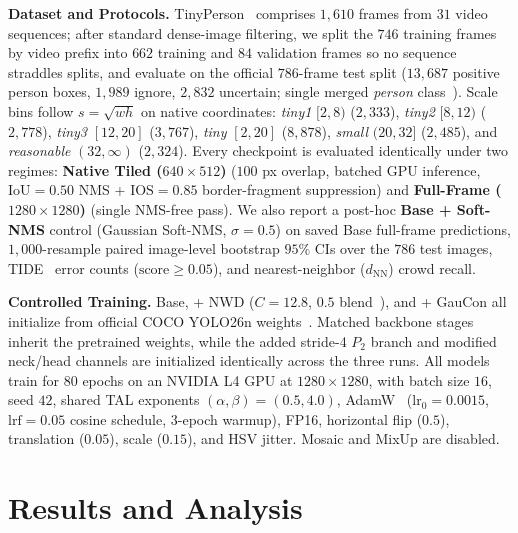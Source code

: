\documentclass[10pt,twocolumn,letterpaper]{article}
\begin{document}
\textbf{Dataset and Protocols.} TinyPerson~\cite{yu2020tinyperson} comprises $1{,}610$ frames from $31$ video sequences; after standard dense-image filtering, we split the $746$ training frames by video prefix into $662$ training and $84$ validation frames so no sequence straddles splits, and evaluate on the official $786$-frame test split ($13{,}687$ positive person boxes, $1{,}989$ ignore, $2{,}832$ uncertain; single merged \textit{person} class~\cite{chao2025bpdyolo}). Scale bins follow $s = \sqrt{wh}$ on native coordinates: \textit{tiny1} $[2,8)$ ($2{,}333$), \textit{tiny2} $[8,12)$ ($2{,}778$), \textit{tiny3} $[12,20]$ ($3{,}767$), \textit{tiny} $[2,20]$ ($8{,}878$), \textit{small} $(20,32]$ ($2{,}485$), and \textit{reasonable} $(32,\infty)$ ($2{,}324$). Every checkpoint is evaluated identically under two regimes: \textbf{Native Tiled ($640\times 512$)} ($100$ px overlap, batched GPU inference, $\mathrm{IoU}=0.50$ NMS + $\mathrm{IOS}=0.85$ border-fragment suppression) and \textbf{Full-Frame ($1280\times 1280$)} (single NMS-free pass). We also report a post-hoc \textbf{Base + Soft-NMS} control (Gaussian Soft-NMS, $\sigma=0.5$) on saved Base full-frame predictions, $1{,}000$-resample paired image-level bootstrap $95\%$ CIs over the $786$ test images, TIDE~\cite{bolya2020tide} error counts ($\text{score}\ge 0.05$), and nearest-neighbor ($d_{\mathrm{NN}}$) crowd recall.

\textbf{Controlled Training.} Base, + NWD ($C=12.8$, $0.5$ blend~\cite{wang2021nwd,xu2022nwd_isprs}), and + GauCon all initialize from official COCO YOLO26n weights~\cite{lin2014coco}. Matched backbone stages inherit the pretrained weights, while the added stride-4 $P_2$ branch and modified neck/head channels are initialized identically across the three runs. All models train for $80$ epochs on an NVIDIA L4 GPU at $1280\times 1280$, with batch size $16$, seed $42$, shared TAL exponents $(\alpha,\beta)=(0.5,4.0)$, AdamW~\cite{loshchilov2017adamw} ($\text{lr}_0=0.0015$, $\text{lrf}=0.05$ cosine schedule, $3$-epoch warmup), FP16, horizontal flip ($0.5$), translation ($0.05$), scale ($0.15$), and HSV jitter. Mosaic and MixUp are disabled.

\section{Results and Analysis}
\label{sec:results}
\end{document}
